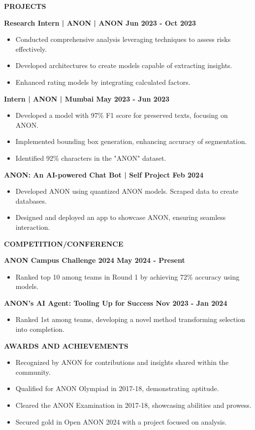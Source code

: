 \documentclass[10pt,a4paper]{article}
\newcommand{\customsection}[1]{%
    \vspace{0.3em}
    \noindent\colorbox{sectionblue}{\parbox{\dimexpr\textwidth-2\fboxsep}{
        \vspace{0.1em}\centering\textbf{\fontsize{10}{12}\selectfont #1}\vspace{0.1em}
    }}
    \vspace{0.3em}
}
\begin{document}
\customsection{PROJECTS}
{\small
\noindent\textbf{Research Intern | ANON | ANON \hfill Jun 2023 - Oct 2023}
\begin{itemize}
\item Conducted comprehensive analysis leveraging techniques to assess risks effectively.
\item Developed architectures to create models capable of extracting insights.
\item Enhanced rating models by integrating calculated factors.
\end{itemize}

\noindent\textbf{Intern | ANON | Mumbai \hfill May 2023 - Jun 2023}
\begin{itemize}
\item Developed a model with 97\% F1 score for preserved texts, focusing on ANON.
\item Implemented bounding box generation, enhancing accuracy of segmentation.
\item Identified 92\% characters in the "ANON" dataset.
\end{itemize}

\noindent\textbf{ANON: An AI-powered Chat Bot | Self Project \hfill Feb 2024}
\begin{itemize}
\item Developed ANON using quantized ANON models. Scraped data to create databases.
\item Designed and deployed an app to showcase ANON, ensuring seamless interaction.
\end{itemize}
}

\customsection{COMPETITION/CONFERENCE}
{\small
\noindent\textbf{ANON Campus Challenge 2024 \hfill May 2024 - Present}
\begin{itemize}
\item Ranked top 10 among teams in Round 1 by achieving 72\% accuracy using models.
\end{itemize}

\noindent\textbf{ANON's AI Agent: Tooling Up for Success \hfill Nov 2023 - Jan 2024}
\begin{itemize}
\item Ranked 1st among teams, developing a novel method transforming selection into completion.
\end{itemize}
}

\customsection{AWARDS AND ACHIEVEMENTS}
{\small
\begin{itemize}
\item Recognized by ANON for contributions and insights shared within the community.
\item Qualified for ANON Olympiad in 2017-18, demonstrating aptitude.
\item Cleared the ANON Examination in 2017-18, showcasing abilities and prowess.
\item Secured gold in Open ANON 2024 with a project focused on analysis.
\end{itemize}
}
\end{document}

